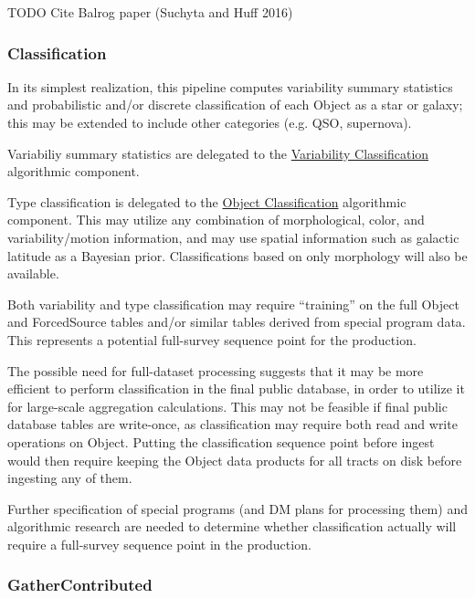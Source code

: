 \begin{note}{TODO}
Cite Balrog paper (Suchyta and  Huff 2016)
\end{note}

\subsubsection{Classification}
\label{sec:drpClassification}

In its simplest realization, this pipeline computes variability summary statistics and probabilistic and/or discrete classification of each Object as a star or galaxy; this may be extended to include other categories (e.g. QSO, supernova).

Variabiliy summary statistics are delegated to the \hyperref[sec:acVariabilityCharacterization]{Variability Classification} algorithmic component.

Type classification is delegated to the \hyperref[sec:acObjectClassification]{Object Classification} algorithmic component.  This may utilize any combination of morphological, color, and variability/motion information, and may use spatial information such as galactic latitude as a Bayesian prior.  Classifications based on only morphology will also be available.

Both variability and type classification may require ``training'' on the full Object and ForcedSource tables and/or similar tables derived from special program data.  This represents a potential full-survey sequence point for the production.

The possible need for full-dataset processing suggests that it may be more efficient to perform classification in the final public database, in order to utilize it for large-scale aggregation calculations.  This may not be feasible if final public database tables are write-once, as classification may require both read and write operations on Object.  Putting the classification sequence point before ingest would then require keeping the Object data products for all tracts on disk before ingesting any of them.

Further specification of special programs (and DM plans for processing them) and algorithmic research are needed to determine whether classification actually will require a full-survey sequence point in the production.

\subsubsection{GatherContributed}
\label{sec:drpGatherContributed}

